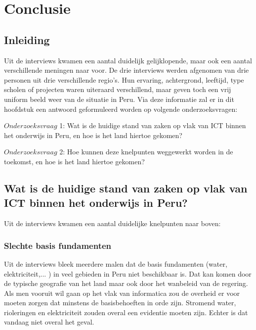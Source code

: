 

\chapter{Conclusie}
\label{ch:conclusie}


\section{Inleiding}
Uit de interviews kwamen een aantal duidelijk gelijklopende, maar ook een aantal verschillende meningen naar voor. De drie interviews werden afgenomen van drie personen uit drie verschillende regio's. Hun ervaring, achtergrond, leeftijd, type  scholen of projecten waren uiteraard verschillend, maar geven toch een vrij uniform beeld weer van de situatie in Peru. Via deze informatie zal er in dit hoofdstuk een antwoord geformuleerd worden op volgende onderzoeksvragen:

$Onderzoeksvraag$ 1: Wat is de huidige stand van zaken op vlak van ICT binnen het onderwijs in Peru, en hoe is het land hiertoe gekomen?

$Onderzoeksvraag$ 2: Hoe kunnen deze knelpunten weggewerkt worden in de toekomst, en hoe is het land hiertoe gekomen?

\section{Wat is de huidige stand van zaken op vlak van ICT binnen het onderwijs in Peru?}
Uit de interviews kwamen een aantal duidelijke knelpunten naar boven:



\subsection{Slechte basis fundamenten}
Uit de interviews bleek meerdere malen dat de basis fundamenten (water, elektriciteit,... ) in veel gebieden in Peru niet beschikbaar is. Dat kan komen door de typische geografie van het land maar ook door het wanbeleid van de regering. Als men vooruit wil gaan op het vlak van informatica zou de overheid er voor moeten zorgen dat minstens de basisbehoeften in orde zijn. Stromend water, rioleringen en elektriciteit zouden overal een evidentie moeten zijn. Echter is dat vandaag niet overal het geval.

